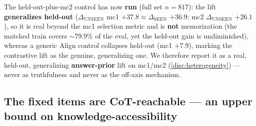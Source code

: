 The held-out-plus-mc2 control has now \textbf{run} (full set $n{=}817$): the lift
\textbf{generalizes held-out} ($\Delta_{\mathrm{UNSEEN}}$ mc1
$+37.8 \approx \Delta_{\mathrm{SEEN}}$ $+36.9$; mc2 $\Delta_{\mathrm{UNSEEN}}$
$+26.1$), so it is real beyond the mc1 selection metric and is \textbf{not}
memorization (the matched train covers ${\sim}79.9\%$ of the eval, yet the held-out
gain is undiminished), whereas a generic Align control collapses held-out (mc1
$+7.9$), marking the contrastive lift as the genuine, generalizing one. We therefore
report it as a real, held-out, generalizing \textbf{answer-prior} lift on mc1/mc2
(\cref{disc:heterogeneity}) --- never as truthfulness and never as the off-axis
mechanism.

\subsection{The fixed items are CoT-reachable --- an upper bound on
knowledge-accessibility}\label{results:arbiter}

